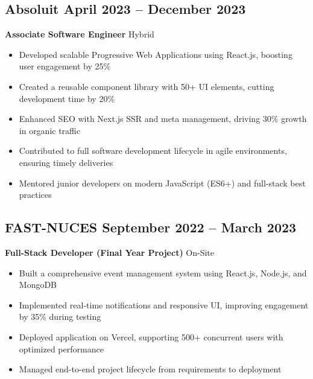 \documentclass[11pt]{article}
\begin{document}
\subsection{\texorpdfstring{Absoluit \hfill April 2023 -- December 2023}{Absoluit, April 2023 -- December 2023}}
\textbf{Associate Software Engineer} \hfill Hybrid
\begin{itemize}
\item Developed scalable Progressive Web Applications using React.js, boosting user engagement by 25\%
\item Created a reusable component library with 50+ UI elements, cutting development time by 20\%
\item Enhanced SEO with Next.js SSR and meta management, driving 30\% growth in organic traffic
\item Contributed to full software development lifecycle in agile environments, ensuring timely deliveries
\item Mentored junior developers on modern JavaScript (ES6+) and full-stack best practices
\end{itemize}

\subsection{\texorpdfstring{FAST-NUCES \hfill September 2022 -- March 2023}{FAST-NUCES, September 2022 -- March 2023}}
\textbf{Full-Stack Developer (Final Year Project)} \hfill On-Site
\begin{itemize}
\item Built a comprehensive event management system using React.js, Node.js, and MongoDB
\item Implemented real-time notifications and responsive UI, improving engagement by 35\% during testing
\item Deployed application on Vercel, supporting 500+ concurrent users with optimized performance
\item Managed end-to-end project lifecycle from requirements to deployment
\end{itemize}

\end{document}
